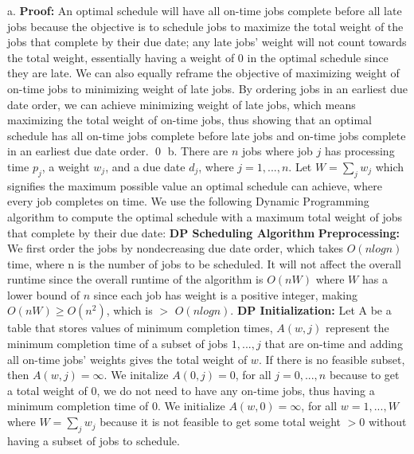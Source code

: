 \documentclass[oneside]{homework} %
\begin{document}
{\large a.} \textbf{Proof:} An optimal schedule will have all on-time jobs complete before all late jobs because the objective is to schedule jobs to maximize the total weight of the jobs that complete by their due date; any late jobs' weight will not count towards the total weight,  essentially having a weight of 0 in the optimal schedule since they are late. We can also equally reframe the objective of maximizing weight of on-time jobs to minimizing weight of late jobs. By ordering jobs in an earliest due date order, we can achieve minimizing weight of late jobs, which means maximizing the total weight of on-time jobs, thus showing that an optimal schedule has all on-time jobs complete before late jobs and on-time jobs complete in an earliest due date order. \hfill\qed
\newline
\newline
{\large b.} There are $n$ jobs where job $j$ has processing time $p_j$, a weight $w_j$, and a due date $d_j$, where $j = 1,...,n$. Let $W = \sum\limits_{j}w_j$ which signifies the maximum possible value an optimal schedule can achieve, where every job completes on time. We use the following Dynamic Programming algorithm to compute the optimal schedule with a maximum total weight of jobs that complete by their due date:
\newline
\newline
\textbf{DP Scheduling Algorithm}
\newline
\newline
\textbf{Preprocessing:} We first order the jobs by nondecreasing due date order, which takes $O(nlogn)$ time, where n is the number of jobs to be scheduled. It will not affect the overall runtime since the overall runtime of the algorithm is $O(nW)$ where $W$ has a lower bound of $n$ since each job has weight is a positive integer, making $O(nW) \geq O(n^2)$, which is $>$ $O(nlogn)$.
\newline
\newline
\textbf{DP Initialization:} Let A be a table that stores values of minimum completion times, $A(w, j)$ represent the minimum completion time of a subset of jobs $1,...,j$ that are on-time and adding all on-time jobs' weights gives the total weight of $w$. If there is no feasible subset, then $A(w,j) = \infty$. We initalize $A(0,j) = 0$, for all $j = 0,...,n$ because to get a total weight of 0, we do not need to have any on-time jobs, thus having a minimum completion time of 0. We initialize $A(w,0) = \infty$, for all $w = 1,...,W$ where $W = \sum\limits_{j}w_j$ because it is not feasible to get some total weight $> 0$ without having a subset of jobs to schedule.
\end{document}
